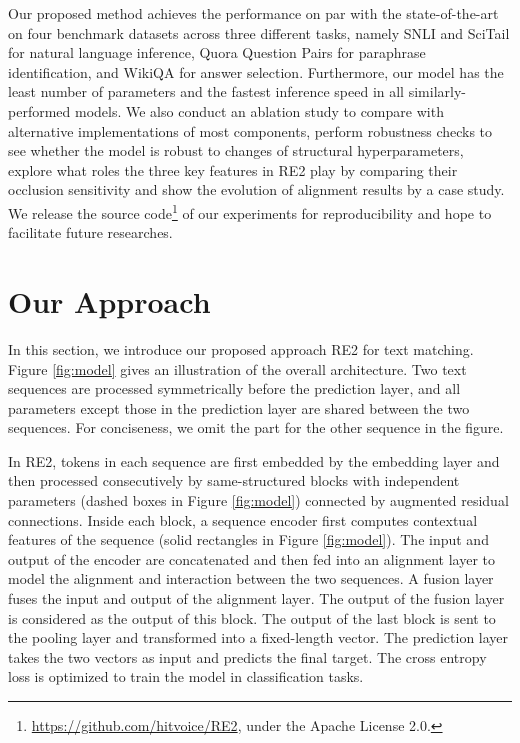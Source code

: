 \documentclass[11pt,a4paper]{article}
\begin{document}
Our proposed method achieves the performance on par with the state-of-the-art on four benchmark datasets across three different tasks, namely SNLI and SciTail for natural language inference, Quora Question Pairs for paraphrase identification, and WikiQA for answer selection. Furthermore, our model has the least number of parameters and the fastest inference speed in all similarly-performed models. We also conduct an ablation study to compare with alternative implementations of most components, perform robustness checks to see whether the model is robust to changes of structural hyperparameters, explore what roles the three key features in RE2 play by comparing their occlusion sensitivity and show the evolution of alignment results by a case study. We release the source code\footnote{\url{https://github.com/hitvoice/RE2}, under the Apache License 2.0.} of our experiments for reproducibility and hope to facilitate future researches.

\section{Our Approach}

In this section, we introduce our proposed approach RE2 for text matching. Figure \ref{fig:model} gives an illustration of the overall architecture. 
Two text sequences are processed symmetrically before the prediction layer, and all parameters except those in the prediction layer are shared between the two sequences. For conciseness, we omit the part for the other sequence in the figure.

In RE2, tokens in each sequence are first embedded by the embedding layer and then processed consecutively by  same-structured blocks with independent parameters (dashed boxes in Figure \ref{fig:model}) connected by augmented residual connections. Inside each block, a sequence encoder first computes contextual features of the sequence (solid rectangles in Figure \ref{fig:model}). The input and output of the encoder are concatenated and then fed into an alignment layer to model the alignment and interaction between the two sequences. A fusion layer fuses the input and output of the alignment layer. The output of the fusion layer is considered as the output of this block. The output of the last block is sent to the pooling layer and transformed into a fixed-length vector. The prediction layer takes the two vectors as input and predicts the final target. The cross entropy loss is optimized to train the model in classification tasks.
\end{document}
